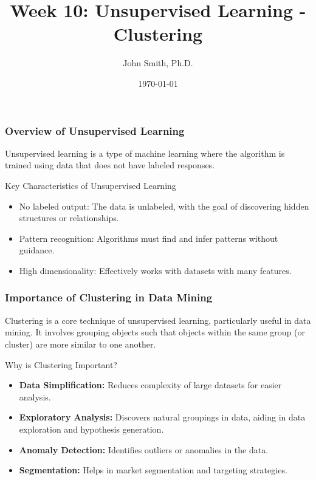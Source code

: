 \documentclass[aspectratio=169]{beamer}
\title[Week 10: Unsupervised Learning]{Week 10: Unsupervised Learning - Clustering}
\author[J. Smith]{John Smith, Ph.D.}
\institute[University Name]{
  Department of Computer Science\\
  University Name\\
  \vspace{0.3cm}
  Email: email@university.edu\\
  Website: www.university.edu
}
\date{\today}
\begin{document}
\frame{\titlepage}

\begin{frame}[fragile]
    \titlepage
\end{frame}

\begin{frame}[fragile]
    \frametitle{Overview of Unsupervised Learning}
    Unsupervised learning is a type of machine learning where the algorithm is trained using data that does not have labeled responses. 

    \begin{block}{Key Characteristics of Unsupervised Learning}
        \begin{itemize}
            \item No labeled output: The data is unlabeled, with the goal of discovering hidden structures or relationships.
            \item Pattern recognition: Algorithms must find and infer patterns without guidance.
            \item High dimensionality: Effectively works with datasets with many features.
        \end{itemize}
    \end{block}
\end{frame}

\begin{frame}[fragile]
    \frametitle{Importance of Clustering in Data Mining}
    Clustering is a core technique of unsupervised learning, particularly useful in data mining. It involves grouping objects such that objects within the same group (or cluster) are more similar to one another. 

    \begin{block}{Why is Clustering Important?}
        \begin{itemize}
            \item \textbf{Data Simplification:} Reduces complexity of large datasets for easier analysis.
            \item \textbf{Exploratory Analysis:} Discovers natural groupings in data, aiding in data exploration and hypothesis generation.
            \item \textbf{Anomaly Detection:} Identifies outliers or anomalies in the data.
            \item \textbf{Segmentation:} Helps in market segmentation and targeting strategies.
        \end{itemize}
    \end{block}
\end{frame}
\end{document}
